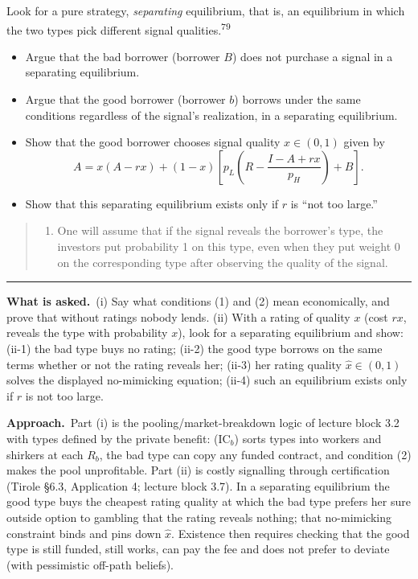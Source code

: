 \documentclass[11pt,a4paper]{article}
\newcommand{\asked}{\par\medskip\noindent\textbf{What is asked.}~}
\newcommand{\approach}{\par\smallskip\noindent\textbf{Approach.}~}
\providecommand{\tightlist}{\setlength{\itemsep}{0pt}\setlength{\parskip}{0pt}}
\newcommand{\stmtend}{\par\endgroup\nopagebreak\noindent\rule{\linewidth}{0.4pt}\par\medskip}
\begin{document}
Look for a pure strategy, \emph{separating} equilibrium, that is, an equilibrium in which the two
types pick different signal qualities.\textsuperscript{79}

\begin{itemize}
\tightlist
\item
  Argue that the bad borrower (borrower \(B\)) does not purchase a signal in a separating
  equilibrium.
\item
  Argue that the good borrower (borrower \(b\)) borrows under the same conditions regardless of the
  signal's realization, in a separating equilibrium.
\item
  Show that the good borrower chooses signal quality \(x \in (0, 1)\) given by
  \[A = x(A - rx) + (1 - x)\left[p_L\left(R - \frac{I - A + rx}{p_H}\right) + B\right].\]
\item
  Show that this separating equilibrium exists only if \(r\) is ``not too large.''
\end{itemize}

\begin{quote}
\begin{enumerate}
\def\labelenumi{\arabic{enumi}.}
\setcounter{enumi}{78}
\tightlist
\item
  One will assume that if the signal reveals the borrower's type, the investors put probability 1 on
  this type, even when they put weight 0 on the corresponding type after observing the quality of
  the signal.
\end{enumerate}
\end{quote}
\stmtend

\asked (i) Say what conditions (1) and (2) mean economically, and prove that without ratings nobody lends. (ii) With a rating of quality $x$ (cost $rx$, reveals the type with probability $x$), look for a separating equilibrium and show: (ii-1) the bad type buys no rating; (ii-2) the good type borrows on the same terms whether or not the rating reveals her; (ii-3) her rating quality $\hat x\in(0,1)$ solves the displayed no-mimicking equation; (ii-4) such an equilibrium exists only if $r$ is not too large.

\approach Part (i) is the pooling/market-breakdown logic of lecture block 3.2 with types defined by the private benefit: (IC$_b$) sorts types into workers and shirkers at each $R_b$, the bad type can copy any funded contract, and condition (2) makes the pool unprofitable. Part (ii) is costly signalling through certification (Tirole \S6.3, Application 4; lecture block 3.7). In a separating equilibrium the good type buys the cheapest rating quality at which the bad type prefers her sure outside option to gambling that the rating reveals nothing; that no-mimicking constraint binds and pins down $\hat x$. Existence then requires checking that the good type is still funded, still works, can pay the fee and does not prefer to deviate (with pessimistic off-path beliefs).
\end{document}
